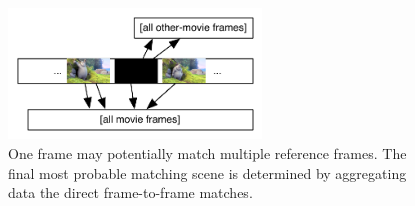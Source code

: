 

\begin{figure}[ch!]
  \centering
  \includegraphics[width=0.6\textwidth]{img/frames-timeline-matching-missmatch}
  \caption{One frame may potentially match multiple reference frames. The final most probable matching scene is determined by aggregating data the direct frame-to-frame matches.}
\end{figure}




















